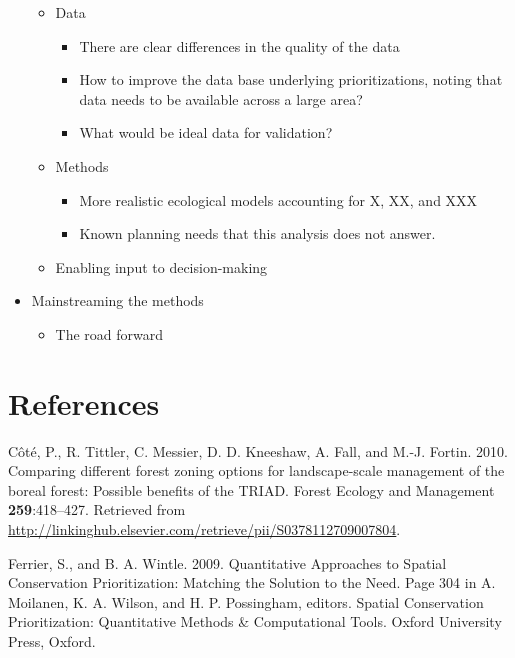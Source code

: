 \documentclass[]{article}
\begin{document}
\begin{itemize}
  \begin{itemize}
  \itemsep1pt\parskip0pt
  \item
    Data

    \begin{itemize}
    \itemsep1pt\parskip0pt
    \item
      There are clear differences in the quality of the data
    \item
      How to improve the data base underlying prioritizations, noting
      that data needs to be available across a large area?
    \item
      What would be ideal data for validation?
    \end{itemize}
  \item
    Methods

    \begin{itemize}
    \itemsep1pt\parskip0pt
    \item
      More realistic ecological models accounting for X, XX, and XXX
    \item
      Known planning needs that this analysis does not answer.
    \end{itemize}
  \item
    Enabling input to decision-making
  \end{itemize}
\item
  Mainstreaming the methods

  \begin{itemize}
  \itemsep1pt\parskip0pt
  \item
    The road forward
  \end{itemize}
\end{itemize}

\section{References}

Côté, P., R. Tittler, C. Messier, D. D. Kneeshaw, A. Fall, and M.-J.
Fortin. 2010. Comparing different forest zoning options for
landscape-scale management of the boreal forest: Possible benefits of
the TRIAD. Forest Ecology and Management \textbf{259}:418--427.
Retrieved from
\url{http://linkinghub.elsevier.com/retrieve/pii/S0378112709007804}.

Ferrier, S., and B. A. Wintle. 2009. Quantitative Approaches to Spatial
Conservation Prioritization: Matching the Solution to the Need. Page 304
in A. Moilanen, K. A. Wilson, and H. P. Possingham, editors. Spatial
Conservation Prioritization: Quantitative Methods \& Computational
Tools. Oxford University Press, Oxford.
\end{document}
